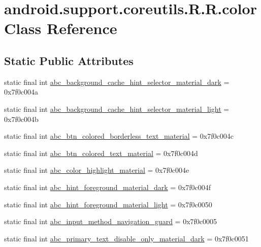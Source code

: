\hypertarget{classandroid_1_1support_1_1coreutils_1_1_r_1_1color}{
\section{android.support.coreutils.R.R.color Class Reference}
\label{classandroid_1_1support_1_1coreutils_1_1_r_1_1color}
}
\subsection*{Static Public Attributes}
\begin{CompactItemize}
\item 
static final int \hyperlink{classandroid_1_1support_1_1coreutils_1_1_r_1_1color_475af30d008905fa51e3fee8073ba2d1}{abc\_\-background\_\-cache\_\-hint\_\-selector\_\-material\_\-dark} = 0x7f0c004a
\item 
static final int \hyperlink{classandroid_1_1support_1_1coreutils_1_1_r_1_1color_f63bf017e484423542f4bd2f162cf0eb}{abc\_\-background\_\-cache\_\-hint\_\-selector\_\-material\_\-light} = 0x7f0c004b
\item 
static final int \hyperlink{classandroid_1_1support_1_1coreutils_1_1_r_1_1color_9839ec5d5a065477e204497d79d0765a}{abc\_\-btn\_\-colored\_\-borderless\_\-text\_\-material} = 0x7f0c004c
\item 
static final int \hyperlink{classandroid_1_1support_1_1coreutils_1_1_r_1_1color_6a924ec3afe975c5de7b809a544c58e2}{abc\_\-btn\_\-colored\_\-text\_\-material} = 0x7f0c004d
\item 
static final int \hyperlink{classandroid_1_1support_1_1coreutils_1_1_r_1_1color_ce61b4d62748c9f36095be4b1f8a5d62}{abc\_\-color\_\-highlight\_\-material} = 0x7f0c004e
\item 
static final int \hyperlink{classandroid_1_1support_1_1coreutils_1_1_r_1_1color_dfb46091abb559f71ee885a68055e6b3}{abc\_\-hint\_\-foreground\_\-material\_\-dark} = 0x7f0c004f
\item 
static final int \hyperlink{classandroid_1_1support_1_1coreutils_1_1_r_1_1color_580dae3a1ec08e97111355f7ec2faa8f}{abc\_\-hint\_\-foreground\_\-material\_\-light} = 0x7f0c0050
\item 
static final int \hyperlink{classandroid_1_1support_1_1coreutils_1_1_r_1_1color_d0fd38a5656165a5fbb6c3d3167b336c}{abc\_\-input\_\-method\_\-navigation\_\-guard} = 0x7f0c0005
\item 
static final int \hyperlink{classandroid_1_1support_1_1coreutils_1_1_r_1_1color_0609a1a938e39c1511b3b3011fa7a927}{abc\_\-primary\_\-text\_\-disable\_\-only\_\-material\_\-dark} = 0x7f0c0051

\end{CompactItemize}
